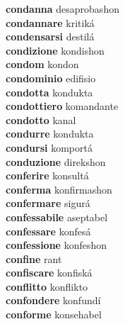 \textbf{condanna } desaprobashon \\
\textbf{condannare } kritiká \\
\textbf{condensarsi } destilá \\
\textbf{condizione } kondishon \\
\textbf{condom } kondon \\
\textbf{condominio } edifisio \\
\textbf{condotta } kondukta \\
\textbf{condottiero } komandante \\
\textbf{condotto } kanal \\
\textbf{condurre } kondukta \\
\textbf{condursi } komportá \\
\textbf{conduzione } direkshon \\
\textbf{conferire } konsultá \\
\textbf{conferma } konfirmashon \\
\textbf{confermare } sigurá \\
\textbf{confessabile } aseptabel \\
\textbf{confessare } konfesá \\
\textbf{confessione } konfeshon \\
\textbf{confine } rant \\
\textbf{confiscare } konfiská \\
\textbf{conflitto } konflikto \\
\textbf{confondere } konfundí \\
\textbf{conforme } konsehabel \\
